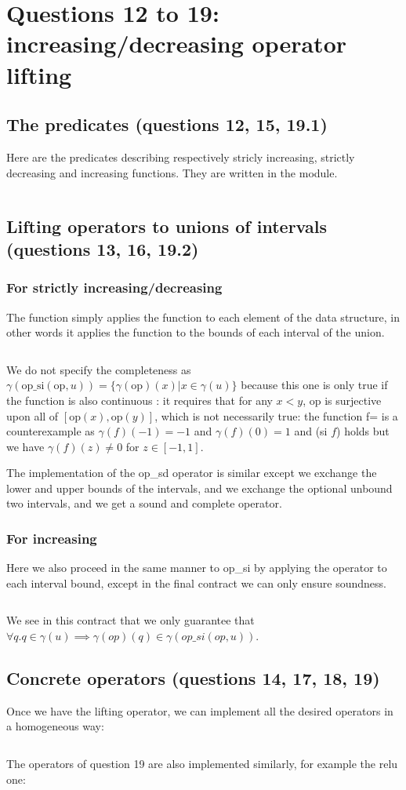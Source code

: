 \section{Questions 12 to 19: increasing/decreasing operator lifting}


\subsection{The predicates (questions 12, 15, 19.1)}
Here are the predicates describing respectively stricly increasing, strictly
decreasing and increasing functions. They are written in the  module.
\inputminted{\whyml}{why3code/op_predicates.mlw}


\subsection{Lifting operators to unions of intervals (questions 13, 16, 19.2)}

\subsubsection{For strictly increasing/decreasing}
%
The  function simply applies the function to each element of the
 data structure, in other words it applies the function to the bounds of
each interval of the union.
%
\inputminted{\whyml}{why3code/op_si.mlw}

We do not specify the completeness as $\gamma(\text{op\_si}(\text{op}, u)) =
\{\gamma(\text{op})(x)|x\in\gamma(u)\}$ because this one is only true if the function
is also continuous : it requires that for any $x < y$, op is surjective upon all of
$[\text{op}(x), \text{op}(y)]$, which is not necessarily true: the function
f= is a counterexample as
$\gamma(f)(-1)=-1$ and $\gamma(f)(0)=1$ and (si $f$) holds but we have
$\gamma(f)(z)\neq 0$ for $z \in [-1, 1]$.

The implementation of the op\_sd operator is similar except we exchange the
lower and upper bounds of the intervals, and we exchange the optional unbound two
intervals, and we get a sound and complete operator.

\subsubsection{For increasing}
Here we also proceed in the same manner to op\_si by applying the operator to each
interval bound, except in the final contract we can only ensure soundness.
\inputminted{\whyml}{why3code/op_nsi.mlw}
%
We see in this contract that we only guarantee that
$\forall q. q\in \gamma(u) \implies \gamma(op)(q) \in \gamma(op\_si(op,u)) $.


\subsection{Concrete operators (questions 14, 17, 18, 19)}
Once we have the lifting operator, we can implement all the desired operators in a
homogeneous way:
\inputminted{\whyml}{why3code/ops.mlw}

The operators of question 19 are also implemented similarly, for example the relu
one:
\inputminted{\whyml}{why3code/relu.mlw}
